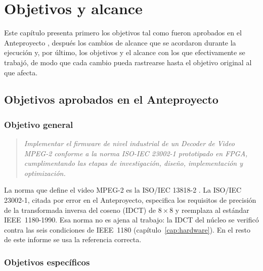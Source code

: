 \chapter{Objetivos y alcance}
\label{cap:objetivos}

Este capítulo presenta primero los objetivos tal como fueron aprobados en el
Anteproyecto \citep{Bustamante_2025_anteproyecto}, después los cambios de
alcance que se acordaron durante la ejecución y, por último, los objetivos y el
alcance con los que efectivamente se trabajó, de modo que cada cambio pueda
rastrearse hasta el objetivo original al que afecta.

\section{Objetivos aprobados en el Anteproyecto}

\subsection{Objetivo general}

\begin{quote}
\itshape
Implementar el firmware de nivel industrial de un Decoder de Video MPEG-2
conforme a la norma ISO-IEC 23002-1 prototipado en FPGA, cumplimentando las
etapas de investigación, diseño, implementación y optimización.
\end{quote}

\begin{nota}
La norma que define el video MPEG-2 es la ISO/IEC 13818-2
\citep{ISO_13818_2}. La ISO/IEC 23002-1, citada por error en el
Anteproyecto, especifica los requisitos de precisión de la transformada
inversa del coseno (IDCT) de $8\times8$ y reemplaza al estándar
IEEE~1180-1990. Esa norma no es ajena al trabajo: la IDCT del núcleo se
verificó contra las seis condiciones de IEEE~1180
(capítulo~\ref{cap:hardware}). En el resto de este informe se usa la
referencia correcta.
\end{nota}

\subsection{Objetivos específicos}
\label{sec:obj-especificos-aprobados}

